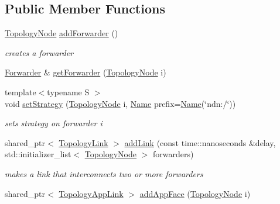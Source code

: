 \subsection*{Public Member Functions}
\begin{DoxyCompactItemize}
\item 
\hyperlink{topology-tester_8hpp_a65eed57bba998574cb3a2e62126f33e8}{Topology\+Node} \hyperlink{classnfd_1_1fw_1_1tests_1_1TopologyTester_aa09028145031342603102240d74d4192}{add\+Forwarder} ()
\begin{DoxyCompactList}\small\item\em creates a forwarder \end{DoxyCompactList}\item 
\hyperlink{classnfd_1_1Forwarder}{Forwarder} \& \hyperlink{classnfd_1_1fw_1_1tests_1_1TopologyTester_ad093668f9269418b8458056cb9acb213}{get\+Forwarder} (\hyperlink{topology-tester_8hpp_a65eed57bba998574cb3a2e62126f33e8}{Topology\+Node} i)
\item 
{\footnotesize template$<$typename S $>$ }\\void \hyperlink{classnfd_1_1fw_1_1tests_1_1TopologyTester_a581f4e8f09d176ab24b632b68ff4d00e}{set\+Strategy} (\hyperlink{topology-tester_8hpp_a65eed57bba998574cb3a2e62126f33e8}{Topology\+Node} i, \hyperlink{classndn_1_1Name}{Name} prefix=\hyperlink{classndn_1_1Name}{Name}(\char`\"{}ndn\+:/\char`\"{}))
\begin{DoxyCompactList}\small\item\em sets strategy on forwarder {\ttfamily i} \end{DoxyCompactList}\item 
shared\+\_\+ptr$<$ \hyperlink{classnfd_1_1fw_1_1tests_1_1TopologyLink}{Topology\+Link} $>$ \hyperlink{classnfd_1_1fw_1_1tests_1_1TopologyTester_aa3e387af7dcd1e7a63d94c7b083d4a40}{add\+Link} (const time\+::nanoseconds \&delay, std\+::initializer\+\_\+list$<$ \hyperlink{topology-tester_8hpp_a65eed57bba998574cb3a2e62126f33e8}{Topology\+Node} $>$ forwarders)
\begin{DoxyCompactList}\small\item\em makes a link that interconnects two or more forwarders \end{DoxyCompactList}\item 
shared\+\_\+ptr$<$ \hyperlink{classnfd_1_1fw_1_1tests_1_1TopologyAppLink}{Topology\+App\+Link} $>$ \hyperlink{classnfd_1_1fw_1_1tests_1_1TopologyTester_ab911dbd99dc7f98c4a350566b7cd6b02}{add\+App\+Face} (\hyperlink{topology-tester_8hpp_a65eed57bba998574cb3a2e62126f33e8}{Topology\+Node} i)\hypertarget{classnfd_1_1fw_1_1tests_1_1TopologyTester_ab911dbd99dc7f98c4a350566b7cd6b02}{}\label{classnfd_1_1fw_1_1tests_1_1TopologyTester_ab911dbd99dc7f98c4a350566b7cd6b02}


\end{DoxyCompactItemize}
